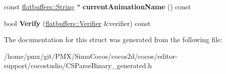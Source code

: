 \begin{DoxyCompactItemize}
\item 
\mbox{\label{structflatbuffers_1_1NodeAction_a9c7e0f543d5a32a6430ee0e801236318}} 
const \hyperlink{structflatbuffers_1_1String}{flatbuffers\+::\+String} $\ast$ {\bfseries current\+Animation\+Name} () const
\item 
\mbox{\label{structflatbuffers_1_1NodeAction_ab231a89ca8cf2c8a9b0f195cce273f4d}} 
bool {\bfseries Verify} (\hyperlink{classflatbuffers_1_1Verifier}{flatbuffers\+::\+Verifier} \&verifier) const
\end{DoxyCompactItemize}


The documentation for this struct was generated from the following file\+:\begin{DoxyCompactItemize}
\item 
/home/pmx/git/\+P\+M\+X/\+Simu\+Cocos/cocos2d/cocos/editor-\/support/cocostudio/C\+S\+Parse\+Binary\+\_\+generated.\+h\end{DoxyCompactItemize}
